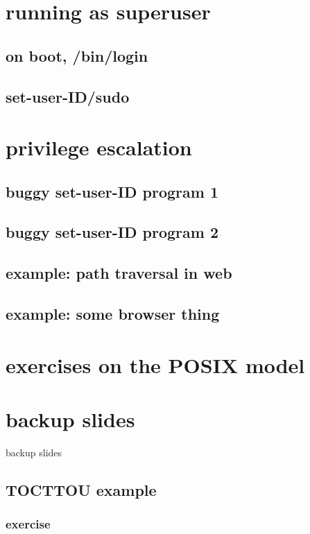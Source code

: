 \section{running as superuser}

\subsection{on boot, /bin/login}


\subsection{set-user-ID/sudo}


\section{privilege escalation}


\subsection{buggy set-user-ID program 1}




\subsection{buggy set-user-ID program 2}

\subsection{example: path traversal in web}

\subsection{example: some browser thing}


\section{exercises on the POSIX model}


\section{backup slides}
\begin{frame}{backup slides}
\end{frame}

\subsection{TOCTTOU example}




\subsubsection{exercise}




